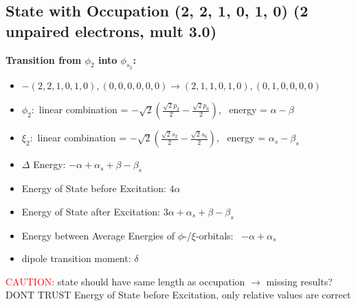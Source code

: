 \documentclass[12pt,a4paper]{article}
\begin{document}
\subsection*{State with Occupation (2, 2, 1, 0, 1, 0) (2 unpaired electrons, mult 3.0)}
        \noindent\textbf{Transition from $\phi_{2}$ into $\phi_{s_{2}}$:}
        \begin{itemize}
            \item $- (2, 2, 1, 0, 1, 0), (0, 0, 0, 0, 0, 0) \rightarrow (2, 1, 1, 0, 1, 0), (0, 1, 0, 0, 0, 0)$
        
            \item $\phi_{2}:$ linear combination = $- \sqrt{2} \left(\frac{\sqrt{2} p_{2}}{2} - \frac{\sqrt{2} p_{6}}{2}\right)$, \
            energy = $\alpha - \beta$
            
            \item $\xi_{2}:$ linear combination = $- \sqrt{2} \left(\frac{\sqrt{2} s_{2}}{2} - \frac{\sqrt{2} s_{6}}{2}\right)$, \
            energy = $\alpha_{s} - \beta_{s}$
            
            \item $\Delta$ Energy: $- \alpha + \alpha_{s} + \beta - \beta_{s}$
            \item Energy of State before Excitation: $4 \alpha$
            \item Energy of State after Excitation: $3 \alpha + \alpha_{s} + \beta - \beta_{s}$
            \item Energy between Average Energies of $\phi$-/$\xi$-orbitals: \
            $- \alpha + \alpha_{s}$
        
            \item dipole transition moment: $\delta$
        
        \end{itemize}
        
	\textcolor{red}{CAUTION:} state should have same length as occupation $\rightarrow$ missing results?
	DONT TRUST \glqq{}Energy of State before Excitation\grqq{}, only relative values are correct
\end{document}
